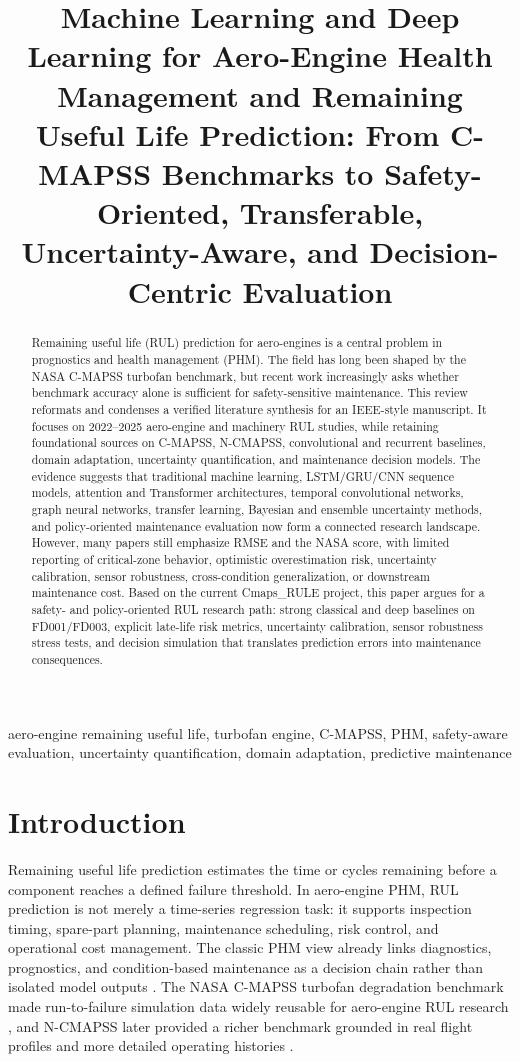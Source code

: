 \documentclass[conference]{IEEEtran}
\title{Machine Learning and Deep Learning for Aero-Engine Health Management and Remaining Useful Life Prediction: From C-MAPSS Benchmarks to Safety-Oriented, Transferable, Uncertainty-Aware, and Decision-Centric Evaluation}
\author{\IEEEauthorblockN{Yibo Huang}
\IEEEauthorblockA{Project: Cmaps\_RULE\\
Email: 24376333@buaa.edu.cn}}
\begin{document}
\maketitle

\begin{abstract}
Remaining useful life (RUL) prediction for aero-engines is a central problem in prognostics and health management (PHM). The field has long been shaped by the NASA C-MAPSS turbofan benchmark, but recent work increasingly asks whether benchmark accuracy alone is sufficient for safety-sensitive maintenance. This review reformats and condenses a verified literature synthesis for an IEEE-style manuscript. It focuses on 2022--2025 aero-engine and machinery RUL studies, while retaining foundational sources on C-MAPSS, N-CMAPSS, convolutional and recurrent baselines, domain adaptation, uncertainty quantification, and maintenance decision models. The evidence suggests that traditional machine learning, LSTM/GRU/CNN sequence models, attention and Transformer architectures, temporal convolutional networks, graph neural networks, transfer learning, Bayesian and ensemble uncertainty methods, and policy-oriented maintenance evaluation now form a connected research landscape. However, many papers still emphasize RMSE and the NASA score, with limited reporting of critical-zone behavior, optimistic overestimation risk, uncertainty calibration, sensor robustness, cross-condition generalization, or downstream maintenance cost. Based on the current Cmaps\_RULE project, this paper argues for a safety- and policy-oriented RUL research path: strong classical and deep baselines on FD001/FD003, explicit late-life risk metrics, uncertainty calibration, sensor robustness stress tests, and decision simulation that translates prediction errors into maintenance consequences.
\end{abstract}

\begin{IEEEkeywords}
aero-engine remaining useful life, turbofan engine, C-MAPSS, PHM, safety-aware evaluation, uncertainty quantification, domain adaptation, predictive maintenance
\end{IEEEkeywords}

\section{Introduction}
Remaining useful life prediction estimates the time or cycles remaining before a component reaches a defined failure threshold. In aero-engine PHM, RUL prediction is not merely a time-series regression task: it supports inspection timing, spare-part planning, maintenance scheduling, risk control, and operational cost management. The classic PHM view already links diagnostics, prognostics, and condition-based maintenance as a decision chain rather than isolated model outputs \cite{Jardine2006CBM}. The NASA C-MAPSS turbofan degradation benchmark made run-to-failure simulation data widely reusable for aero-engine RUL research \cite{Saxena2008CMAPSS,NASA_PCoE_CMAPSS}, and N-CMAPSS later provided a richer benchmark grounded in real flight profiles and more detailed operating histories \cite{AriasChao2021NCMAPSS}.
\end{document}
